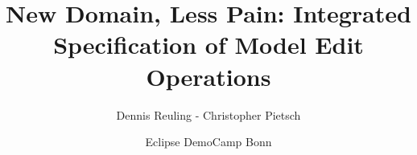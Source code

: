 %
%
\title[Integrated\\Specification\\ of MEO]{New Domain, Less Pain: Integrated Specification of Model Edit Operations}
\subtitle{}
\author[D. Reuling\\C. Pietsch]{Dennis Reuling - Christopher Pietsch}
\date[24.11.2014]{Eclipse DemoCamp Bonn}

%
%


\usepackage[english]{babel}

%
%
\newcommand{\allSections}{



%


%


}
